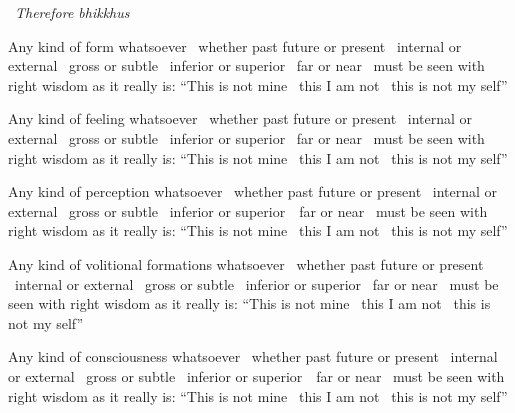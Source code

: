 \begin{english-only-leader}
  \anglebracketleft\ \hspace{-0.5mm}\textit{Therefore bhikkhus} \hspace{-0.5mm}\anglebracketright\
\end{english-only-leader}
\begin{english-only-hangtogether}
  Any kind of form whatsoever \breathmark\ whether past future or present \breathmark\ internal or external \breathmark\ gross or subtle \breathmark\ inferior or superior \breathmark\ far or near \breathmark\ must be seen with right wisdom as it really is: ``This is not mine \breathmark\ this I am not \breathmark\ this is not my self''
\end{english-only-hangtogether}

\begin{english-only-hang}
  Any kind of feeling whatsoever \breathmark\ whether past future or present \breathmark\ internal or external \breathmark\ gross or subtle \breathmark\ inferior or superior \breathmark\ far or near \breathmark\ must be seen with right wisdom as it really is: ``This is not mine \breathmark\ this I am not \breathmark\ this is not my self''
\end{english-only-hang}

\begin{english-only-hang}
  Any kind of perception whatsoever \breathmark\ whether past future or present \breathmark\ internal or external \breathmark\ gross or subtle \breathmark\ inferior or \mbox{superior}~\breathmark\ far or near \breathmark\ must be seen with right wisdom as it really is: ``This is not mine \breathmark\ this I am not \breathmark\ this is not my self''
\end{english-only-hang}

\begin{english-only-hang}
  Any kind of volitional formations whatsoever \breathmark\ whether past future or present \breathmark\ internal or external \breathmark\ gross or subtle \breathmark\ inferior or superior \breathmark\ far or near \breathmark\ must be seen with right wisdom as it really is: ``This is not mine \breathmark\ this I am not \breathmark\ this is not my self''
\end{english-only-hang}

\begin{english-only-hang}
  Any kind of consciousness whatsoever \breathmark\ whether past future or present \breathmark\ internal or external \breathmark\ gross or subtle \breathmark\ inferior or \mbox{superior}~\breathmark\ far or near \breathmark\ must be seen with right wisdom as it really is: ``This is not mine \breathmark\ this I am not \breathmark\ this is not my self''
\end{english-only-hang}

